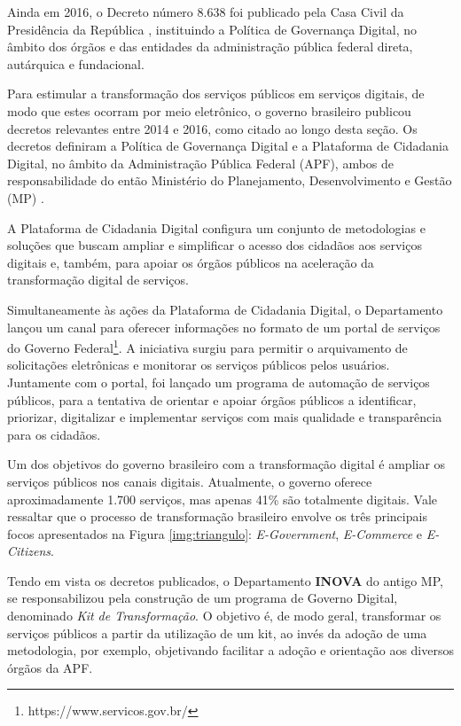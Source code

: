 Ainda em 2016, o Decreto número 8.638 foi publicado pela Casa Civil da Presidência da República \cite{BRASIL2016c}, instituindo a Política de Governança Digital, no âmbito dos órgãos e das entidades da administração pública federal direta, autárquica e fundacional. 


Para estimular a transformação dos serviços públicos em serviços digitais, de modo que estes ocorram por meio eletrônico, o governo
brasileiro publicou decretos relevantes entre 2014 e 2016, como citado ao longo desta seção. Os decretos definiram a Política de Governança
Digital e a Plataforma de Cidadania Digital, no âmbito da Administração Pública Federal (APF), ambos de responsabilidade do então 
Ministério do Planejamento, Desenvolvimento e Gestão (MP) \cite{BRASIL, BRASIL2016}. 

A Plataforma de Cidadania Digital configura um conjunto de metodologias e soluções que buscam ampliar e simplificar o acesso dos cidadãos aos serviços digitais e, também, para apoiar os órgãos públicos na aceleração da transformação digital de serviços.  

Simultaneamente às ações da Plataforma de Cidadania Digital, o Departamento lançou um canal para oferecer informações no
formato de um portal de serviços do Governo Federal\footnote{https://www.servicos.gov.br/}. A iniciativa surgiu para permitir o arquivamento de solicitações eletrônicas e monitorar os serviços públicos pelos usuários. Juntamente com o portal, foi lançado um programa de automação de serviços públicos, para a tentativa de orientar e apoiar órgãos públicos a identificar, priorizar, digitalizar e implementar serviços 
com mais qualidade e transparência para os cidadãos.

Um dos objetivos do governo brasileiro com a transformação digital é ampliar os serviços públicos nos canais digitais. 
Atualmente, o governo oferece aproximadamente 1.700 serviços, mas apenas 41\% são totalmente digitais. Vale ressaltar que o processo de transformação brasileiro envolve os três principais focos apresentados na Figura \ref{img:triangulo}: \textit{E-Government}, \textit{E-Commerce} e \textit{E-Citizens}.

Tendo em vista os decretos publicados, o Departamento \textbf{INOVA} do antigo MP, se responsabilizou pela construção de um programa de Governo Digital, denominado \textit{Kit de Transformação}. O objetivo é, de modo geral, transformar os serviços públicos a partir da utilização de um kit, ao invés da adoção de uma metodologia, por exemplo, objetivando facilitar a adoção e orientação aos diversos órgãos da APF.

